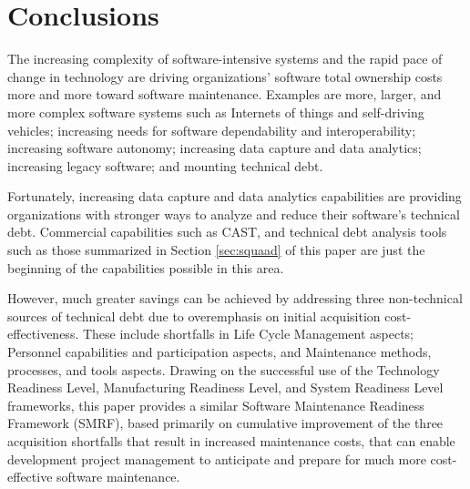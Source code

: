 \section{Conclusions}
\label{sec:conclusion}
The increasing complexity of software-intensive systems and the rapid pace of change in technology are driving organizations' software total ownership costs more and more toward software maintenance. Examples are more, larger, and more complex software systems such as Internets of things and self-driving vehicles; increasing needs for software dependability and interoperability; increasing software autonomy; increasing data capture and data analytics; increasing legacy software; and mounting technical debt.

Fortunately, increasing data capture and data analytics capabilities are  providing organizations with stronger ways to analyze and reduce their software's technical debt. Commercial capabilities such as CAST, and technical debt analysis tools such as those summarized in Section \ref{sec:squaad} of this paper are just the beginning of the capabilities possible in this area.

However, much greater savings can be achieved by addressing three non-technical sources of technical debt due to overemphasis  on initial acquisition cost-effectiveness. These include shortfalls  in Life Cycle Management aspects; Personnel capabilities and participation aspects, and Maintenance methods, processes, and tools aspects. Drawing on the successful use of the Technology Readiness Level, Manufacturing Readiness Level, and System Readiness Level frameworks, this paper provides a similar Software Maintenance Readiness Framework (SMRF), based primarily on cumulative improvement of the three acquisition shortfalls that result in increased maintenance costs, that can enable development project management to anticipate and prepare for much more cost-effective software maintenance.